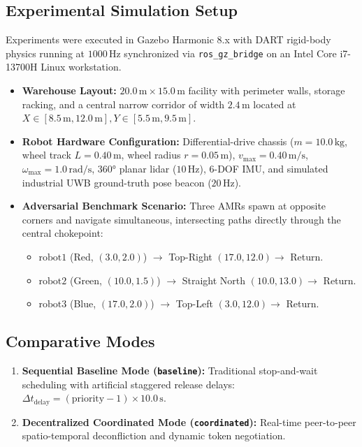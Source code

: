 \documentclass[10pt,twocolumn,a4paper]{article}
\theoremstyle{definition}
\begin{document}
\subsection{Experimental Simulation Setup}
Experiments were executed in Gazebo Harmonic 8.x with DART rigid-body physics running at $1000\,\text{Hz}$ synchronized via \texttt{ros\_gz\_bridge} on an Intel Core i7-13700H Linux workstation.
\begin{itemize}
    \item \textbf{Warehouse Layout:} $20.0\,\text{m} \times 15.0\,\text{m}$ facility with perimeter walls, storage racking, and a central narrow corridor of width $2.4\,\text{m}$ located at $X \in [8.5\,\text{m}, 12.0\,\text{m}], Y \in [5.5\,\text{m}, 9.5\,\text{m}]$.
    \item \textbf{Robot Hardware Configuration:} Differential-drive chassis ($m = 10.0\,\text{kg}$, wheel track $L = 0.40\,\text{m}$, wheel radius $r = 0.05\,\text{m}$), $v_{\max} = 0.40\,\text{m/s}$, $\omega_{\max} = 1.0\,\text{rad/s}$, 360° planar lidar ($10\,\text{Hz}$), 6-DOF IMU, and simulated industrial UWB ground-truth pose beacon ($20\,\text{Hz}$).
    \item \textbf{Adversarial Benchmark Scenario:} Three AMRs spawn at opposite corners and navigate simultaneous, intersecting paths directly through the central chokepoint:
    \begin{itemize}
        \item $\text{robot1}$ (Red, $(3.0, 2.0)$) $\to$ Top-Right $(17.0, 12.0) \to$ Return.
        \item $\text{robot2}$ (Green, $(10.0, 1.5)$) $\to$ Straight North $(10.0, 13.0) \to$ Return.
        \item $\text{robot3}$ (Blue, $(17.0, 2.0)$) $\to$ Top-Left $(3.0, 12.0) \to$ Return.
    \end{itemize}
\end{itemize}

\subsection{Comparative Modes}
\begin{enumerate}
    \item \textbf{Sequential Baseline Mode (\texttt{baseline}):} Traditional stop-and-wait scheduling with artificial staggered release delays: $\Delta t_{\text{delay}} = (\text{priority} - 1) \times 10.0\,\text{s}$.
    \item \textbf{Decentralized Coordinated Mode (\texttt{coordinated}):} Real-time peer-to-peer spatio-temporal deconfliction and dynamic token negotiation.
\end{enumerate}
\end{document}
